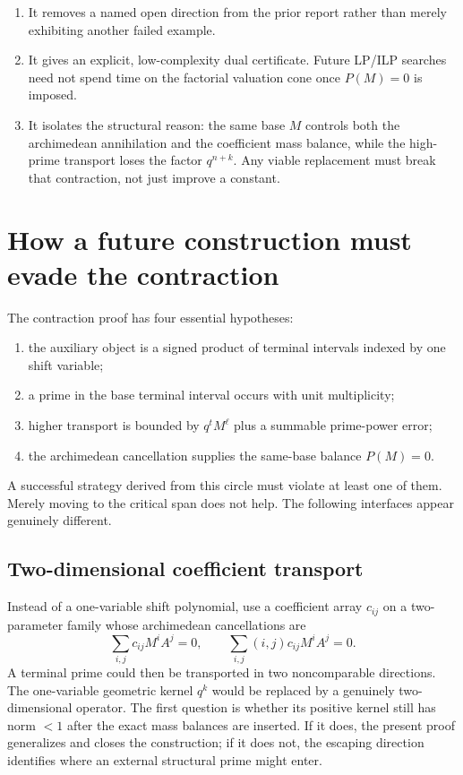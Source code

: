 \documentclass[11pt,oneside]{article}
\theoremstyle{definition}
\theoremstyle{remark}
\begin{document}
\begin{enumerate}
\item It removes a named open direction from the prior report rather than merely exhibiting
another failed example.
\item It gives an explicit, low-complexity dual certificate.  Future LP/ILP searches need not
spend time on the factorial valuation cone once $P(M)=0$ is imposed.
\item It isolates the structural reason: the same base $M$ controls both the archimedean
annihilation and the coefficient mass balance, while the high-prime transport loses the
factor $q^{n+k}$.  Any viable replacement must break that contraction, not just improve a
constant.
\end{enumerate}

\section{How a future construction must evade the contraction}
\label{sec:escape}

The contraction proof has four essential hypotheses:

\begin{enumerate}[label=\textbf{H\arabic*.}]
\item the auxiliary object is a signed product of terminal intervals indexed by one shift
variable;
\item a prime in the base terminal interval occurs with unit multiplicity;
\item higher transport is bounded by $q^tM^\ell$ plus a summable prime-power error;
\item the archimedean cancellation supplies the same-base balance $P(M)=0$.
\end{enumerate}

A successful strategy derived from this circle must violate at least one of them.  Merely
moving to the critical span does not help.  The following interfaces appear genuinely
different.

\subsection{Two-dimensional coefficient transport}

Instead of a one-variable shift polynomial, use a coefficient array $c_{ij}$ on a
two-parameter family whose archimedean cancellations are
\[
 \sum_{i,j}c_{ij}M^iA^j=0,
 \qquad
 \sum_{i,j}(i,j)c_{ij}M^iA^j=0.
\]
A terminal prime could then be transported in two noncomparable directions.  The one-variable
geometric kernel $q^k$ would be replaced by a genuinely two-dimensional operator.  The first
question is whether its positive kernel still has norm $<1$ after the exact mass balances are
inserted.  If it does, the present proof generalizes and closes the construction; if it does
not, the escaping direction identifies where an external structural prime might enter.
\end{document}
